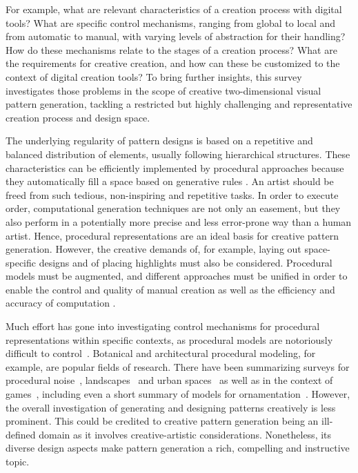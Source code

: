 For example, what are relevant characteristics of a creation process with digital tools? What are specific control mechanisms, ranging from global to local and from automatic to manual, with varying levels of abstraction for their handling? How do these mechanisms relate to the stages of a creation process? What are the requirements for creative creation, and how can these be customized to the context of digital creation tools? To bring further insights, this survey investigates those problems in the scope of creative two-dimensional visual pattern generation, tackling a restricted but highly challenging and representative creation process and design space. 

The underlying regularity of pattern designs is based on a repetitive and balanced distribution of elements, usually following hierarchical structures. These characteristics can be efficiently implemented by procedural approaches because they automatically fill a space based on generative rules \cite{stava_2010_ipm}. An artist should be freed from such tedious, non-inspiring and repetitive tasks. In order to execute order, computational generation techniques are not only an easement, but they also perform in a potentially more precise and less error-prone way than a human artist. Hence, procedural representations are an ideal basis for creative pattern generation. However, the creative demands of, for example, laying out space-specific designs and of placing highlights must also be considered. Procedural models must be augmented, and different approaches must be unified in order to enable the control and quality of manual creation as well as the efficiency and accuracy of computation \cite{gieseke_2017_ooo}. 

Much effort has gone into investigating control mechanisms for procedural representations within specific contexts, as procedural models are notoriously difficult to control~\cite{bourque_2004_ptm,lagae_2010_pis,gilet_2010_ias,benes_2011_gpm,lasram_2012_ssf,lasram_2012_ptp}. Botanical and architectural procedural modeling, for example, are popular fields of research. There have been summarizing surveys for procedural noise~\cite{lagae_2010_sap}, landscapes~\cite{smelik_2014_aso} and urban spaces~\cite{vanegas_2009_mab} as well as in the context of games~\cite{hendrikx_2013_pcg, togelius_2011_sbp}, including even a short summary of models for ornamentation~\cite{whitehead_2010_tpd}. However, the overall investigation of generating and designing patterns creatively is less prominent. This could be credited to creative pattern generation being an ill-defined domain as it involves creative-artistic considerations. Nonetheless, its diverse design aspects make pattern generation a rich, compelling and instructive topic.

